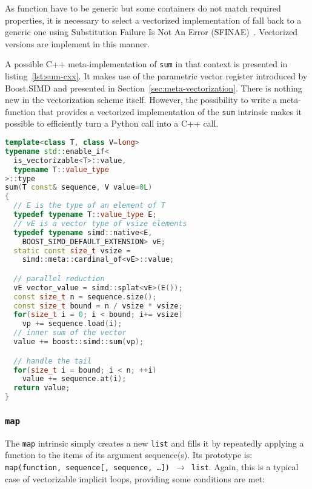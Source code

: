 \documentclass[10pt]{sigplanconf}
\begin{document}
As function have to be generic but some containers do not match required
properties, it is necessary to select a vectorized implementation of fall back
to a generic one using Substitution Failure Is Not An Error
(SFINAE)~\cite{metaprogramming2002}. Vectorized versions are implement in this manner.

A possible C++ meta-implementation of \texttt{sum} in that context is presented
in listing~\ref{lst:sum-cxx}. It makes use of the parametric vector register
introduced by Boost.SIMD and presented in Section~\ref{sec:meta-vectorization}.
There is nothing new in the vectorization scheme itself. However, the
possibility to write a meta-function that provides a vectorized implementation
of the \texttt{sum} intrinsic makes it possible to efficiently turn a Python
call into a C++ call.

\begin{lstlisting}[language=c++, label={lst:sum-cxx}, caption={Meta-implementation of the \texttt{sum} intrinsic in C++11.}]
template<class T, class V=long>
typename std::enable_if<
  is_vectorizable<T>::value,
  typename T::value_type
>::type
sum(T const& sequence, V value=0L)
{
  // E is the type of an element of T
  typedef typename T::value_type E;
  // vE is a vector type of vsize elements
  typedef typename simd::native<E,
    BOOST_SIMD_DEFAULT_EXTENSION> vE;
  static const size_t vsize =
    simd::meta::cardinal_of<vE>::value;

  // parallel reduction
  vE vector_value = simd::splat<vE>(E());
  const size_t n = sequence.size();
  const size_t bound = n / vsize * vsize;
  for(size_t i = 0; i < bound; i+= vsize)
    vp += sequence.load(i);
  // inner sum of the vector
  value += boost::simd::sum(vp);

  // handle the tail
  for(size_t i = bound; i < n; ++i)
    value += sequence.at(i);
  return value;
}
\end{lstlisting}

\subsubsection{\texttt{map}}

The \texttt{map} intrinsic simply creates a new \texttt{list} and fills it by
repeatedly applying a function to the items of its argument sequence(s). Its
prototype is: \texttt{map(function, sequence[, sequence, \dots]) $\rightarrow$
list}. Again, this is a typical case of vectorizable implicit loops, providing
some conditions are met:
\end{document}
